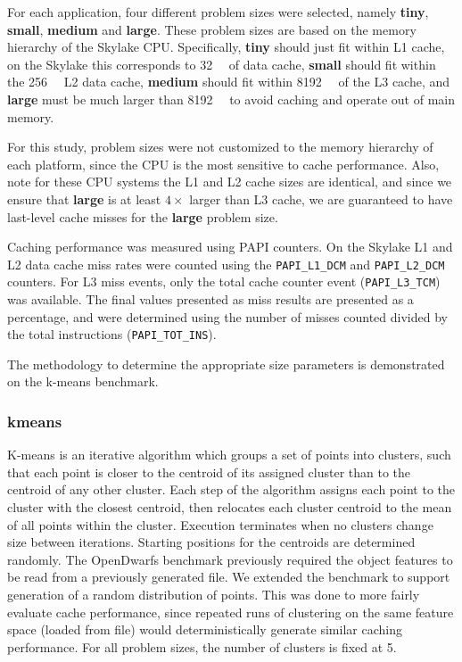 \documentclass[../document.tex]{subfiles}
\begin{document}
\label{ssec:setting_sizes}

For each application, four different problem sizes were selected, namely {\bf tiny}, {\bf small}, {\bf medium} and {\bf large}.
These problem sizes are based on the memory hierarchy of the Skylake CPU.
Specifically, {\bf tiny} should just fit within L1 cache, on the Skylake this corresponds to \SI{32}{\kibi\byte} of data cache, {\bf small} should fit within the \SI{256}{\kibi\byte} L2 data cache, {\bf medium} should fit within \SI{8192}{\kibi\byte} of the L3 cache, and {\bf large} must be much larger than \SI{8192}{\kibi\byte} to avoid caching and operate out of main memory.

For this study, problem sizes were not customized to the memory hierarchy of each platform, since the CPU is the most sensitive to cache performance.
Also, note for these CPU systems the L1 and L2 cache sizes are identical, and since we ensure that {\bf large} is at least $4\times$ larger than L3 cache, we are guaranteed to have last-level cache misses for the {\bf large} problem size.

Caching performance was measured using PAPI counters.
On the Skylake L1 and L2 data cache miss rates were counted using the {\tt PAPI\_L1\_DCM} and {\tt PAPI\_L2\_DCM} counters.
For L3 miss events, only the total cache counter event ({\tt PAPI\_L3\_TCM}) was available.
The final values presented as miss results are presented as a percentage, and were determined using the number of misses counted divided by the total instructions ({\tt PAPI\_TOT\_INS}).

The methodology to determine the appropriate size parameters is demonstrated on the k-means benchmark.

\subsubsection{kmeans}
K-means is an iterative algorithm which groups a set of points into clusters, such that each point is closer to the centroid of its assigned cluster than to the centroid of any other cluster.
Each step of the algorithm assigns each point to the cluster with the closest centroid, then relocates each cluster centroid to the mean of all points within the cluster.
Execution terminates when no clusters change size between iterations.
Starting positions for the centroids are determined randomly.
The OpenDwarfs benchmark previously required the object features to be read from a previously generated file.
We extended the benchmark to support generation of a random distribution of points.
This was done to more fairly evaluate cache performance, since repeated runs of clustering on the same feature space (loaded from file) would deterministically generate similar caching performance.
For all problem sizes, the number of clusters is fixed at 5.
\end{document}
